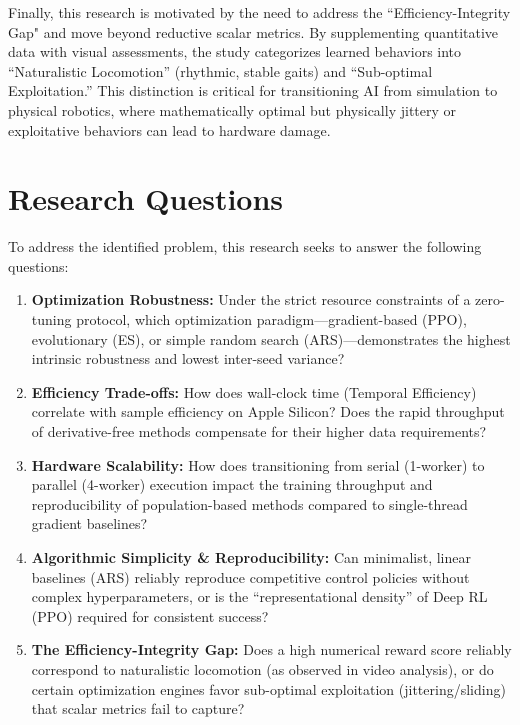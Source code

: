 Finally, this research is motivated by the need to address the ``Efficiency-Integrity Gap" and move beyond reductive scalar metrics. By supplementing quantitative data with visual assessments, the study categorizes learned behaviors into “Naturalistic Locomotion” (rhythmic, stable gaits) and “Sub-optimal Exploitation.” This distinction is critical for transitioning AI from simulation to physical robotics, where mathematically optimal but physically jittery or exploitative behaviors can lead to hardware damage.
\section{Research Questions}

To address the identified problem, this research seeks to answer the following questions:

\begin{enumerate}
    \item \textbf{Optimization Robustness:} Under the strict resource constraints of a zero-tuning protocol, which optimization paradigm—gradient-based (PPO), evolutionary (ES), or simple random search (ARS)—demonstrates the highest intrinsic robustness and lowest inter-seed variance?
    \item \textbf{Efficiency Trade-offs:} How does wall-clock time (Temporal Efficiency) correlate with sample efficiency on Apple Silicon? Does the rapid throughput of derivative-free methods compensate for their higher data requirements?

    \item \textbf{Hardware Scalability:} How does transitioning from serial (1-worker) to parallel (4-worker) execution impact the training throughput and reproducibility of population-based methods compared to single-thread gradient baselines?

    \item \textbf{Algorithmic Simplicity \& Reproducibility:} Can minimalist, linear baselines (ARS) reliably reproduce competitive control policies without complex hyperparameters, or is the ``representational density'' of Deep RL (PPO) required for consistent success?

    \item \textbf{The Efficiency-Integrity Gap:} Does a high numerical reward score reliably correspond to naturalistic locomotion (as observed in video analysis), or do certain optimization engines favor sub-optimal exploitation (jittering/sliding) that scalar metrics fail to capture?
\end{enumerate}

